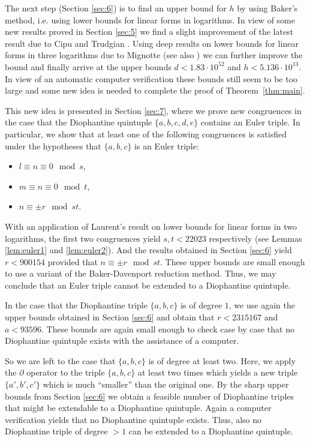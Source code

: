 \documentclass{amsart}
\theoremstyle{definition}
\begin{document}
The next step (Section \ref{sec:6}) is to find an upper bound for $h$ by using Baker's method, i.e. using lower bounds for linear forms
in logarithms. In view of some new results proved in Section \ref{sec:5} we find a slight improvement of the latest result due to Cipu
and Trudgian \cite{Cipu-Trudgian}. Using deep results on lower bounds for linear forms in three logarithms due to Mignotte \cite{Mignotte:kit}
(see also \cite{BMS1,BMS2}) we can further improve the bound and finally arrive at the upper bounds $d<1.83 \cdot 10^{52}$ and $h<5.136 \cdot 10^{13}$. In view of an automatic computer verification these bounds still seem to be too large and some new idea is needed to complete the proof of Theorem~\ref{thm:main}.

This new idea is presented in Section \ref{sec:7}, where we prove new congruences in the case that the Diophantine quintuple $\{a,b,c,d,e\}$ contains an Euler triple. In particular, we show that at least one of the following congruences is satisfied under the hypotheses that $\{a,b,c\}$ is an Euler triple:
\begin{itemize}
 \item $l\equiv n\equiv 0 \mod s$,
 \item $m\equiv n\equiv 0 \mod t$,
 \item $n\equiv \pm r \mod st$.
\end{itemize}
With an application of Laurent's result \cite{Laurent:2008} on lower bounds for linear forms in two logarithms, the first two congruences yield $s,t<22023$ respectively (see Lemmas \ref{lem:euler1} and \ref{lem:euler2}). And the results obtained in Section \ref{sec:6} yield $r<900154$ provided that $n\equiv \pm r \mod st$. These upper bounds are small enough to use a variant of the Baker-Davenport reduction method. Thus, we may conclude that an Euler triple cannot be extended to a Diophantine quintuple.

In the case that the Diophantine triple $\{a,b,c\}$ is of degree $1$, we use again the upper bounds obtained in Section \ref{sec:6} and obtain that
$r<2315167$ and $a<93596$. These bounds are again small enough to check case by case that no Diophantine quintuple exists with the assistance of a computer. 

So we are left to the case that $\{a, b, c\}$ is of degree at least two. Here, we apply the $\partial$ operator to the triple
$\{a, b, c\}$ at least two times which yields a new triple $\{a',b',c'\}$ which is much ``smaller'' than the original one.
By the sharp upper bounds from Section \ref{sec:6} we obtain a feasible number of Diophantine triples that might be extendable to a Diophantine quintuple. Again a computer verification yields that no Diophantine quintuple exists. Thus, also no Diophantine triple of degree $>1$ can be extended to a Diophantine quintuple.
\end{document}
